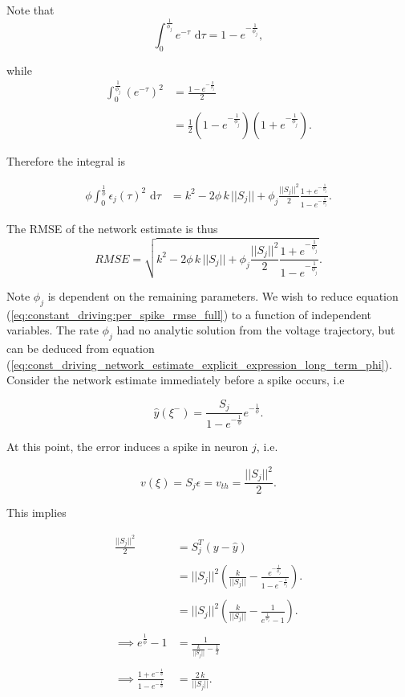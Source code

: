 Note that
$$
\int_{0}^{\frac{1}{\phi_j}} \! e^{-\tau} \, \, \mathrm{d}\tau 
=
1-e^{-\frac{1}{\phi_j}},
$$

while 
\begin{align*}
\int_{0}^{\frac{1}{\phi_j}} \! \left(e^{-\tau}\right)^2
&=
\frac
{
	1 - e^{-\frac{2}{\phi_j}}
}
{2}
\\
\\
&= 
\frac{1}{2}\left(1 - e^{-\frac{1}{\phi_j}}\right) \left(1 + e^{-\frac{1}{\phi_j}}\right).
\end{align*}

Therefore the integral is

\begin{align*}
\phi\int_{0}^{\frac{1}{\phi}} \!  \epsilon_j(\tau)^2 \, \, \mathrm{d}\tau 
&= 
k^2  - 
 2  \phi \, k \, ||S_j|| +
  \phi_j \frac{||S_j||^2}{2} \frac{1 + e^{-\frac{1}{\phi_j}}}{1 - e^{-\frac{1}{\phi_j}}}.
\end{align*}


The  RMSE of the network estimate is thus
\begin{equation}
\label{eq:constant_driving:per_spike_rmse_full}
RMSE =
\sqrt
{
k^2 - 
 2  \phi \, k \, ||S_j|| +
  \phi_j \frac{||S_j||^2}{2} \frac{1 + e^{-\frac{1}{\phi_j}}}{1 - e^{-\frac{1}{\phi_j}}}
}.
\end{equation}

Note $\phi_j$ is dependent on the remaining parameters. We wish to reduce equation (\ref{eq:constant_driving:per_spike_rmse_full}) to a function of independent variables. The rate $\phi_j$ had no analytic solution from the voltage trajectory, but can be deduced from equation (\ref{eq:const_driving_network_estimate_explicit_expression_long_term_phi}). Consider the network estimate immediately before a spike occurs, i.e

$$
\hat{y}(\xi^{-}) = \frac{S_j}{1 - e^{-\frac{1}{\phi}}} e^{-\frac{1}{\phi}}.
$$

At this point, the error induces a spike in neuron $j$, i.e.

$$
 v(\xi) = S_j \epsilon = v_{th} = \frac{||S_j||^2}{2}.
$$

This implies 

\begin{align*}
\frac{||S_j||^2}{2} 
&=
S_j^T\left( y-\hat{y}\right)
\\
\\
&=
||S_j||^2\left( \frac{k}{||S_j||}  - \frac{e^{-\frac{1}{\phi_j}}}{1 - e^{-\frac{1}{\phi_j}}}\right).
\\
\\
&=
||S_j||^2\left( \frac{k}{||S_j||}   - \frac{1}{e^{\frac{1}{\phi_j}} - 1}\right).
\\
\\
\implies
e^{\frac{1}{\phi}} - 1
&=
\frac{1}{
\frac{k}{||S_j||}  - \frac{1}{2}}
\\
\\
\implies
\frac{1 + e^{-\frac{1}{\phi}}}{1-e^{-\frac{1}{\phi}}} 
&=
\frac{2\,k}{||S_j||}.
\end{align*}

